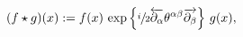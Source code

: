 \begin{equation}\label{sp}
 (f\star g)(x):=f(x)\,\exp\left\{\sfrac{i}{2}
 \overleftarrow{\partial_{\alpha}}
 \theta^{\alpha\beta}\overrightarrow{\partial_{\beta}}\right\}\,g(x),
\end{equation}

